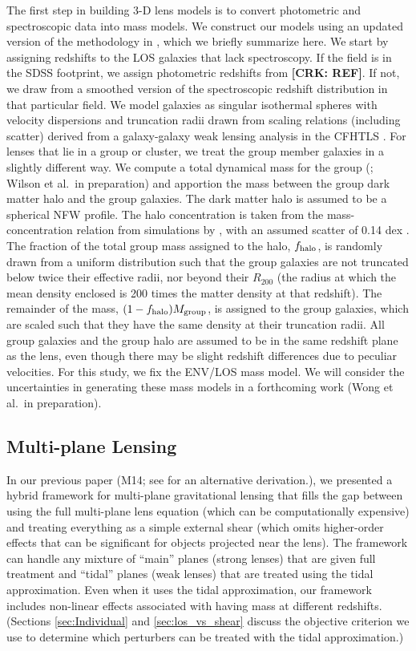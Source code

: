 \documentclass{emulateapj}
\newcommand\crk[1]{\textbf{[CRK: #1]}}
\begin{document}
The first step in building 3-D lens models is to convert photometric and spectroscopic data into mass models. We construct our models using an updated version of the methodology in \citet{Wong11}, which we briefly summarize here. We start by assigning redshifts to the LOS galaxies that lack spectroscopy. If the field is in the SDSS footprint, we assign photometric redshifts from \crk{REF}. If not, we draw from a smoothed version of the spectroscopic redshift distribution in that particular field. We model galaxies as singular isothermal spheres with velocity dispersions and truncation radii drawn from scaling relations (including scatter) derived from a galaxy-galaxy weak lensing analysis in the CFHTLS \citep{Brimioulle13}. For lenses that lie in a group or cluster, we treat the group member galaxies in a slightly different way. We compute a total dynamical mass for the group (\citealt{Girardi98,Momcheva06,Momcheva15}; Wilson et al.\ in preparation) and apportion the mass between the group dark matter halo and the group galaxies. The dark matter halo is assumed to be a spherical NFW profile. The halo concentration is taken from the mass-concentration relation from simulations by \citet{Zhao09}, with an assumed scatter of 0.14 dex \citep{Bullock01}. The fraction of the total group mass assigned to the halo, $f_{\rm{halo}}$, is randomly drawn from a uniform distribution such that the group galaxies are not truncated below twice their effective radii, nor beyond their $R_{200}$ (the radius at which the mean density enclosed is 200 times the matter density at that redshift). The remainder of the mass, $(1-f_{\rm{halo}})M_{\rm{group}}$, is assigned to the group galaxies, which are scaled such that they have the same density at their truncation radii. All group galaxies and the group halo are assumed to be in the same redshift plane as the lens, even though there may be slight redshift differences due to peculiar velocities. For this study, we fix the ENV/LOS mass model. We will consider the uncertainties in generating these mass models in a forthcoming work (Wong et al.\ in preparation). 

\subsection{Multi-plane Lensing}

In our previous paper (M14; see \citealt{Schneider14} for an alternative derivation.), we presented a hybrid framework for multi-plane gravitational lensing that fills the gap between using the full multi-plane lens equation (which can be computationally expensive) and treating everything as a simple external shear (which omits higher-order effects that can be significant for objects projected near the lens). The framework can handle any mixture of ``main'' planes (strong lenses) that are given full treatment and ``tidal'' planes (weak lenses) that are treated using the tidal approximation. Even when it uses the tidal approximation, our framework includes non-linear effects associated with having mass at different redshifts.  (Sections \ref{sec:Individual} and \ref{sec:los_vs_shear} discuss the objective criterion we use to determine which perturbers can be treated with the tidal approximation.)
\end{document}
